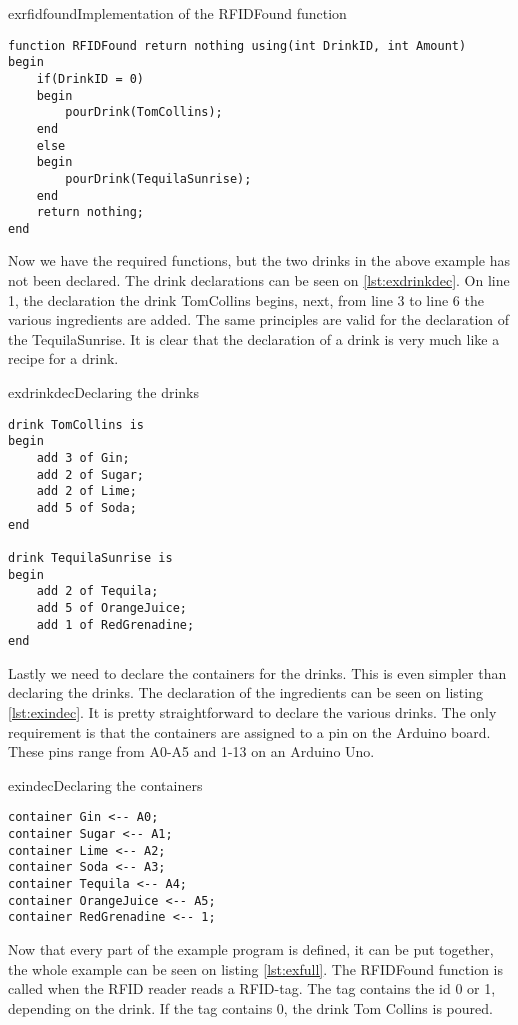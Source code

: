 \begin{code}{exrfidfound}{Implementation of the RFIDFound function}
\begin{lstlisting}
function RFIDFound return nothing using(int DrinkID, int Amount)
begin
	if(DrinkID = 0)
	begin
		pourDrink(TomCollins);
	end
	else
	begin
		pourDrink(TequilaSunrise);
	end
	return nothing;
end
\end{lstlisting}
\end{code}

Now we have the required functions, but the two drinks in the above example has not been declared. The drink declarations can be seen on \ref{lst:exdrinkdec}. On line 1, the declaration the drink TomCollins begins, next, from line 3 to line 6 the various ingredients are added. The same principles are valid for the declaration of the TequilaSunrise. It is clear that the declaration of a drink is very much like a recipe for a drink. 

\begin{code}{exdrinkdec}{Declaring the drinks}
\begin{lstlisting}
drink TomCollins is
begin
	add 3 of Gin;
	add 2 of Sugar;
	add 2 of Lime;
	add 5 of Soda;
end

drink TequilaSunrise is 
begin
	add 2 of Tequila;
	add 5 of OrangeJuice;
	add 1 of RedGrenadine;
end
\end{lstlisting}
\end{code}

Lastly we need to declare the containers for the drinks. This is even simpler than declaring the drinks. The declaration of the ingredients can be seen on listing \ref{lst:exindec}. It is pretty straightforward to declare the various drinks. The only requirement is that the containers are assigned to a pin on the Arduino board. These pins range from A0-A5 and 1-13 on an Arduino Uno.

\begin{code}{exindec}{Declaring the containers}
\begin{lstlisting}
container Gin <-- A0;
container Sugar <-- A1;
container Lime <-- A2;
container Soda <-- A3;
container Tequila <-- A4;
container OrangeJuice <-- A5;
container RedGrenadine <-- 1;
\end{lstlisting}
\end{code}

Now that every part of the example program is defined, it can be put together, the whole example can be seen on listing \ref{lst:exfull}. The RFIDFound function is called when the RFID reader reads a RFID-tag. The tag contains the id 0 or 1, depending on the drink. If the tag contains 0, the drink Tom Collins is poured. 

